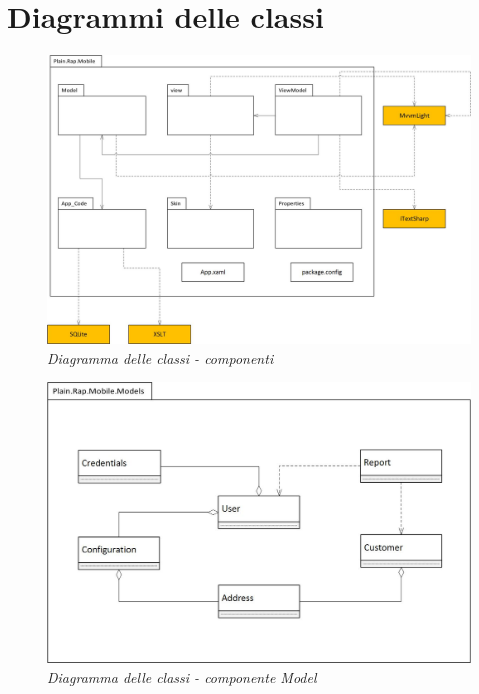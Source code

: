 \newpage
\chapter{Diagrammi delle classi}
\label{cap:Diagrammi delle classi}

	\begin{figure}[ht]
		\centering
		\includegraphics[scale=0.35]{immagini/progettazione/plainrap_portable.jpg}
		\caption{\textit{Diagramma delle classi - componenti}}
	\end{figure}\FloatBarrier
	
	\begin{figure}[ht]
		\centering
		\includegraphics[scale=0.45]{immagini/progettazione/Models.jpg}
		\caption{\textit{Diagramma delle classi - componente Model}}
	\end{figure}\FloatBarrier
	
